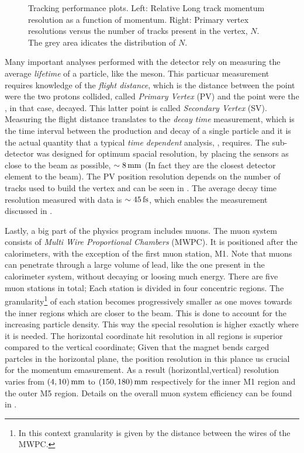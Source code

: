 \begin{figure}[t]
\begin{subfigure}{0.5\textwidth}
    \caption{}
    \label{det_velo_pv_res}
  \end{subfigure}
  \caption{Tracking performance plots. Left: Relative Long track momentum resolution as a function of momentum.
          Right: Primary vertex resolutions versus the number of tracks present in the vertex, $N$. The grey area 
          idicates the distribution of $N$.}
  \label{det_velo_perf}
\end{figure}

Many important analyses performed with the \lhcb detector rely on measuring the average {\it lifetime} of a particle,
like the \Bs meson. This particuar measurement requires knowledge of the {\it flight distance}, which is the
distance between the point were the two protons collided, called {\it Primary Vertex} (PV) and the point were the
\Bs, in that case, decayed. This latter point is called {\it Secondary Vertex} (SV). Measuring the flight distance
translates to the {\it decay time} measurement, which is the time interval between the production and decay of a
single particle and it is the actual quantity that a typical {\it time dependent} analysis, \eg \BsJpsiPhi, requires.
The \velo sub-detector was designed for optimum spacial resolution, by placing the \velo sensors as close to the beam
as possible, $\sim 8 \rm \,mm$ (In fact they are the closest detector element to the \lhcb beam).  
The PV position resolution depends on the number of tracks used to build the vertex and can
be seen in . The average decay time resolution measured with \BsJpsiPhi data is $\sim 45\rm \,fs$,
which enables the \phis measurement discussed in .

Lastly, a big part of the \lhcb physics program includes muons. The muon system consists of {\it Multi Wire Proportional Chambers}
(MWPC). It is positioned after the calorimeters, with the exception of the first muon station, M1.
Note that muons can penetrate through a large volume of lead, like the one present in the calorimeter system,
without decaying or loosing much energy. There are five muon stations in total; Each station is divided in four concentric
regions. The granularity\footnote{In this context granularity is given by the distance between the wires of the MWPC.}
of each station becomes progressively smaller as one moves towards the inner regions which are closer to the beam.
This is done to account for the increasing particle density. This way the special resolution is higher exactly where
it is needed. The horizontal coordinate hit resolution in all regions is superior compared to the vertical coordinate;
Given that the \lhcb magnet bends carged partcles in the horizontal plane, the position resolution in this plance
us crucial for the momentum emasurement. As a result (horizontlal,vertical) resolution varies from $(4,10)\rm \,mm$ to
$(150,180)\rm \,mm$ respectively for the inner M1 region and the outer M5 region. Details on the overall muon system 
efficiency can be found in \cite{AlvesJr:1492807}. 

